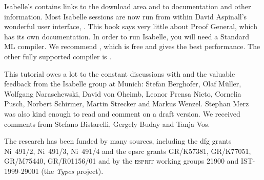 Isabelle's
contains links to the download area and to documentation and other
information.  Most Isabelle sessions are now run from within David
Aspinall's wonderful user interface,
.  This book says
very little about Proof General, which has its own documentation.  In
order to run Isabelle, you will need a Standard ML compiler.  We
recommend , which is free and
gives the best performance.  The other fully supported compiler is
.

This tutorial owes a lot to the constant discussions with and the valuable
feedback from the Isabelle group at Munich: Stefan Berghofer, Olaf
M{\"u}ller, Wolfgang Naraschewski, David von Oheimb, Leonor Prensa Nieto,
Cornelia Pusch, Norbert Schirmer, Martin Strecker and Markus Wenzel. Stephan
Merz was also kind enough to read and comment on a draft version.  We
received comments from Stefano Bistarelli, Gergely Buday and Tanja
Vos.

The research has been funded by many sources, including the {\sc dfg} grants
Ni~491/2, Ni~491/3, Ni~491/4 and the {\sc epsrc} grants GR\slash K57381,
GR\slash K77051, GR\slash M75440, GR\slash R01156\slash 01 and by the
\textsc{esprit} working groups 21900 and IST-1999-29001 (the \emph{Types}
project).
